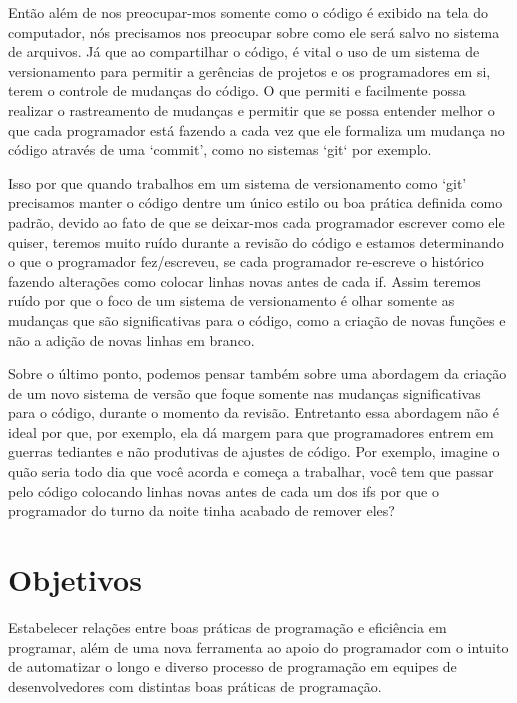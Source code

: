 {    Então além de nos preocupar-mos somente como o código é exibido na tela do computador, nós
    precisamos nos preocupar sobre como ele será salvo no sistema de arquivos. Já que ao
    compartilhar o código, é vital o uso de um sistema de versionamento para permitir a gerências de
    projetos e os programadores em si, terem o controle de mudanças do código. O que permiti e
    facilmente possa realizar o rastreamento de mudanças e permitir que se possa entender melhor o
    que cada programador está fazendo a cada vez que ele formaliza um mudança no código através de
    uma `commit', como no sistemas `git` por exemplo.

    Isso por que quando trabalhos em um sistema de versionamento como `git' precisamos manter o
    código dentre um único estilo ou boa prática definida como padrão, devido ao fato de que se
    deixar-mos cada programador escrever como ele quiser, teremos muito ruído durante a revisão do
    código e estamos determinando o que o programador fez/escreveu, se cada programador re-escreve o
    histórico fazendo alterações como colocar linhas novas antes de cada if. Assim teremos ruído por
    que o foco de um sistema de versionamento é olhar somente as mudanças que são significativas
    para o código, como a criação de novas funções e não a adição de novas linhas em branco.

    Sobre o último ponto, podemos pensar também sobre uma abordagem da criação de um novo sistema de
    versão que foque somente nas mudanças significativas para o código, durante o momento da
    revisão. Entretanto essa abordagem não é ideal por que, por exemplo, ela dá margem para que
    programadores entrem em guerras tediantes e não produtivas de ajustes de código. Por exemplo,
    imagine o quão seria todo dia que você acorda e começa a trabalhar, você tem que passar pelo
    código colocando linhas novas antes de cada um dos if\textquotesingle s por que o programador do
    turno da noite tinha acabado de remover eles?


\section{Objetivos}

    Estabelecer relações entre boas práticas de programação e eficiência em programar, além de uma
    nova ferramenta ao apoio do programador com o intuito de automatizar o longo e diverso processo
    de programação em equipes de desenvolvedores com distintas boas práticas de programação.


}

